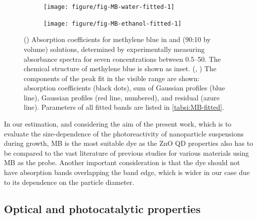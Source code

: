 \documentclass[9pt,twoside,twocolumn]{article}\usepackage{knitr}
\begin{document}
\begin{refsection}
\begin{figure}[tbp]
\begin{subfigure}[b]{0.49\linewidth}
\begin{knitrout}
{\centering \texttt{[image: figure/fig-MB-water-fitted-1]} 

}


\end{knitrout}
\end{subfigure}%
\hfill%
\begin{subfigure}[b]{0.49\linewidth}
\caption{}
\label{fig:MB-ethanol-fitted}
\begin{knitrout}\footnotesize
{}\color{fgcolor}

{\centering \texttt{[image: figure/fig-MB-ethanol-fitted-1]} 

}


\end{knitrout}
\end{subfigure}%
\caption{() Absorption coefficients for methylene blue in  and  (90:10 by volume) solutions, determined by experimentally measuring absorbance spectra for seven concentrations between \qtyrange[range-phrase=\ensuremath{\text{ and }}]{0.5}{50}{\micromolar}.
The chemical structure of methylene blue is shown as inset.
(, ) The components of the peak fit in the visible range are shown: absorption coefficients (black dots), sum of Gaussian profiles (blue line), Gaussian profiles (red line, numbered), and residual (azure line).
Parameters of all fitted bands are listed in \cref{tabsi:MB-fitted}.}
\label{fig:MB-abs-coefficients}
\end{figure}

In our estimation, and considering the aim of the present work, which is to evaluate the size-dependence of the photoreactivity of  nanoparticle suspensions during growth, MB is the most suitable dye as the ZnO QD properties also has to be compared to the vast literature of previous studies for various materials using MB as the probe.
Another important consideration is that the dye should not have absorption bands overlapping the  band edge, which is wider in our case due to its dependence on the particle diameter.



\subsection{Optical and photocatalytic properties}


\end{refsection}
\end{document}
